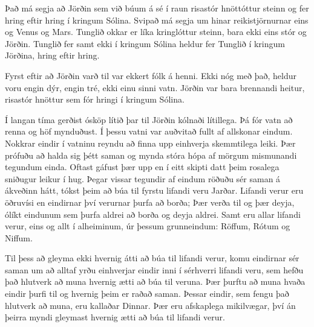 \documentclass[ebook,11pt,oneside,openany]{memoir}
\begin{document}
Það má segja að Jörðin sem við búum á sé í raun risastór hnöttóttur steinn og fer hring eftir hring í kringum Sólina. Svipað má segja um hinar reikistjörnurnar eins og Venus og Mars. Tunglið okkar er líka kringlóttur steinn, bara ekki eins stór og Jörðin. Tunglið fer samt ekki í kringum Sólina heldur fer Tunglið í kringum Jörðina, hring eftir hring.

\bigskip

Fyrst eftir að Jörðin varð til var ekkert fólk á henni. Ekki nóg með það, heldur voru engin dýr, engin tré, ekki einu sinni vatn. Jörðin var bara brennandi heitur, risastór hnöttur sem fór hringi í kringum Sólina.

Í langan tíma gerðist ósköp lítið þar til Jörðin kólnaði lítillega. Þá fór vatn að renna og höf mynduðust. Í þessu vatni var auðvitað fullt af allskonar eindum. Nokkrar eindir í vatninu reyndu að finna upp einhverja skemmtilega leiki. Þær prófuðu að halda sig þétt saman og mynda stóra hópa af mörgum mismunandi tegundum einda. Oftast gáfust þær upp en í eitt skipti datt þeim rosalega sniðugur leikur í hug. Þegar vissar tegundir af eindum röðuðu sér saman á ákveðinn hátt, tókst þeim að búa til fyrstu lifandi veru Jarðar. Lifandi verur eru öðruvísi en eindirnar því verurnar þurfa að borða; Þær verða til og þær deyja, ólíkt eindunum sem þurfa aldrei að borða og deyja aldrei. Samt eru allar lifandi verur, eins og allt í alheiminum, úr þessum grunneindum: Röffum, Rótum og Niffum.

Til þess að gleyma ekki hvernig átti að búa til lifandi verur, komu eindirnar sér saman um að alltaf yrðu einhverjar eindir inni í sérhverri lifandi veru, sem hefðu það hlutverk að muna hvernig ætti að búa til veruna. Þær þurftu að muna hvaða eindir þurfi til og hvernig þeim er raðað saman. Þessar eindir, sem fengu það hlutverk að muna, eru kallaðar Dinnar. Þær eru afskaplega mikilvægar, því án þeirra myndi gleymast hvernig ætti að búa til lifandi verur.
\end{document}
